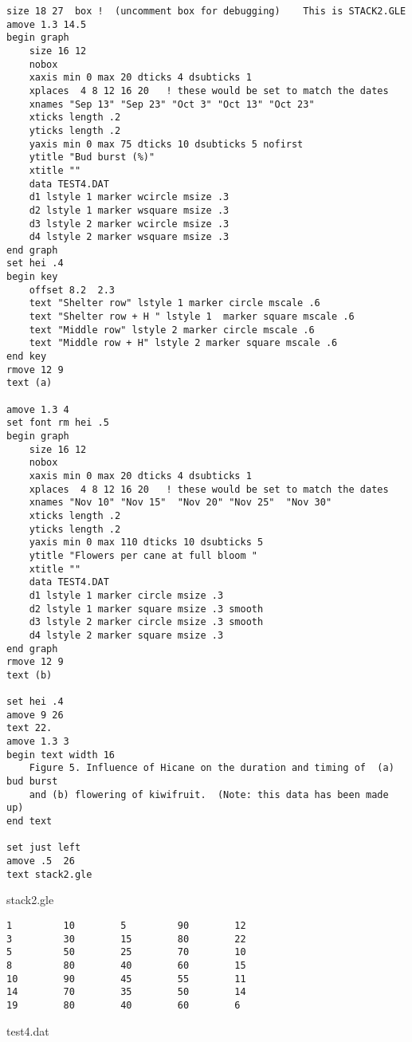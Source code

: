 \clearpage
\vfill
\begin{center}
\begin{minipage}[t]{12.0cm}
{\scriptsize %
\begin{verbatim}
size 18 27  box !  (uncomment box for debugging)    This is STACK2.GLE 
amove 1.3 14.5
begin graph
	size 16 12
	nobox
	xaxis min 0 max 20 dticks 4 dsubticks 1
	xplaces  4 8 12 16 20	! these would be set to match the dates
	xnames "Sep 13" "Sep 23" "Oct 3" "Oct 13" "Oct 23"
	xticks length .2
	yticks length .2
	yaxis min 0 max 75 dticks 10 dsubticks 5 nofirst
	ytitle "Bud burst (%)"
	xtitle ""
	data TEST4.DAT
	d1 lstyle 1 marker wcircle msize .3
	d2 lstyle 1 marker wsquare msize .3
	d3 lstyle 2 marker wcircle msize .3
	d4 lstyle 2 marker wsquare msize .3
end graph
set hei .4 
begin key
	offset 8.2  2.3
	text "Shelter row" lstyle 1 marker circle mscale .6
	text "Shelter row + H " lstyle 1  marker square mscale .6
	text "Middle row" lstyle 2 marker circle mscale .6
	text "Middle row + H" lstyle 2 marker square mscale .6
end key
rmove 12 9 
text (a)

amove 1.3 4 
set font rm hei .5
begin graph
	size 16 12
	nobox
	xaxis min 0 max 20 dticks 4 dsubticks 1
	xplaces  4 8 12 16 20	! these would be set to match the dates
	xnames "Nov 10" "Nov 15"  "Nov 20" "Nov 25"  "Nov 30"
	xticks length .2
	yticks length .2
	yaxis min 0 max 110 dticks 10 dsubticks 5
	ytitle "Flowers per cane at full bloom "
	xtitle ""
	data TEST4.DAT
	d1 lstyle 1 marker circle msize .3
	d2 lstyle 1 marker square msize .3 smooth
	d3 lstyle 2 marker circle msize .3 smooth
	d4 lstyle 2 marker square msize .3
end graph
rmove 12 9 
text (b)

set hei .4 
amove 9 26
text 22.
amove 1.3 3
begin text width 16
	Figure 5. Influence of Hicane on the duration and timing of  (a) bud burst 
	and (b) flowering of kiwifruit.  (Note: this data has been made up)
end text

set just left
amove .5  26
text stack2.gle                                    
\end{verbatim}
} %
\hfill {\small stack2.gle}\\
\vspace*{-4.0ex} %
{\footnotesize
\begin{verbatim}
1         10        5         90        12        
3         30        15        80        22        
5         50        25        70        10        
8         80        40        60        15        
10        90        45        55        11        
14        70        35        50        14        
19        80        40        60        6         
\end{verbatim}
}
\hfill {\small test4.dat}\\
\end{minipage}
\end{center}
\vfill
